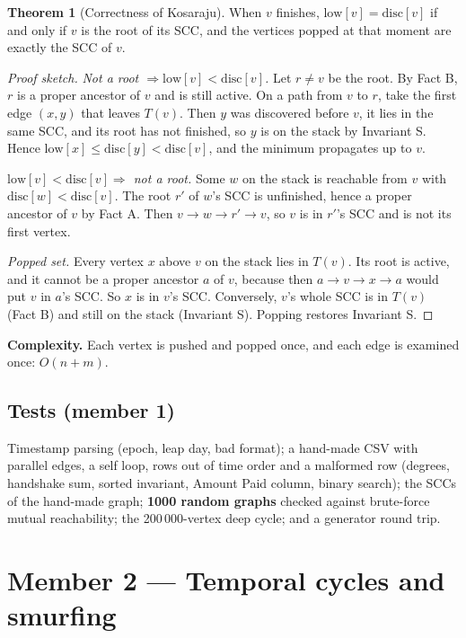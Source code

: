\documentclass[11pt,a4paper]{article}
\theoremstyle{definition}
\newtheorem{theorem}[definition]{Theorem}
\begin{document}
\begin{theorem}[Correctness of Kosaraju]
When $v$ finishes, $\text{low}[v] = \text{disc}[v]$ if and only if $v$ is the root of its SCC, and the vertices popped at that moment are exactly the SCC of $v$.
\end{theorem}

\begin{proof}[Proof sketch]
\emph{Not a root $\Rightarrow \text{low}[v] < \text{disc}[v]$.} Let $r \ne v$ be the root. By Fact B, $r$ is a proper ancestor of $v$ and is still active. On a path from $v$ to $r$, take the first edge $(x, y)$ that leaves $T(v)$. Then $y$ was discovered before $v$, it lies in the same SCC, and its root has not finished, so $y$ is on the stack by Invariant S. Hence $\text{low}[x] \le \text{disc}[y] < \text{disc}[v]$, and the minimum propagates up to $v$.

\emph{$\text{low}[v] < \text{disc}[v] \Rightarrow$ not a root.} Some $w$ on the stack is reachable from $v$ with $\text{disc}[w] < \text{disc}[v]$. The root $r'$ of $w$'s SCC is unfinished, hence a proper ancestor of $v$ by Fact A. Then $v \to w \to r' \to v$, so $v$ is in $r'$'s SCC and is not its first vertex.

\emph{Popped set.} Every vertex $x$ above $v$ on the stack lies in $T(v)$. Its root is active, and it cannot be a proper ancestor $a$ of $v$, because then $a \to v \to x \to a$ would put $v$ in $a$'s SCC. So $x$ is in $v$'s SCC. Conversely, $v$'s whole SCC is in $T(v)$ (Fact B) and still on the stack (Invariant S). Popping restores Invariant S.
\end{proof}

\noindent\textbf{Complexity.} Each vertex is pushed and popped once, and each edge is examined once: $O(n + m)$.

\subsection{Tests (member 1)}
Timestamp parsing (epoch, leap day, bad format); a hand-made CSV with parallel edges, a self loop, rows out of time order and a malformed row (degrees, handshake sum, sorted invariant, Amount Paid column, binary search); the SCCs of the hand-made graph; \textbf{1000 random graphs} checked against brute-force mutual reachability; the 200\,000-vertex deep cycle; and a generator round trip.

\newpage
\section{Member 2 --- Temporal cycles and smurfing}
\end{document}

